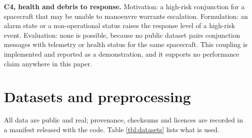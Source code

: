 \documentclass[3p,times]{elsarticle}
\begin{document}
\textbf{C4, health and debris to response.} Motivation: a high-risk
conjunction for a spacecraft that may be unable to manoeuvre warrants
escalation. Formulation: an alarm state or a non-operational status
raises the response level of a high-risk event. Evaluation: none is
possible, because no public dataset pairs conjunction messages with
telemetry or health status for the same spacecraft. This coupling is
implemented and reported as a demonstration, and it supports no
performance claim anywhere in this paper.

\section{Datasets and preprocessing}\label{sec:data}

All data are public and real; provenance, checksums and licences are
recorded in a manifest released with the code. Table \ref{tbl:datasets}
lists what is used.
\end{document}

